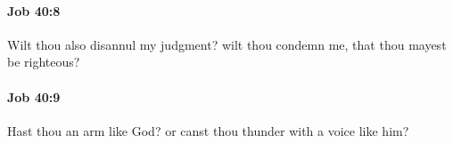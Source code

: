		\paragraph{Job 40:8} %
			\label{JOB-40-8}

			Wilt thou also disannul my judgment? wilt thou condemn me, that thou mayest be righteous?


		\paragraph{Job 40:9} %
			\label{JOB-40-9}

			Hast thou an arm like God? or canst thou thunder with a voice like him?


